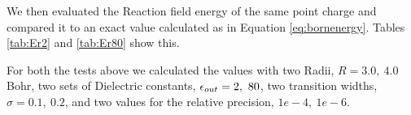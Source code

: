 \documentclass[../master_thesis.tex]{subfiles}
\begin{document}
We then evaluated the Reaction field energy of the same point charge and compared it
to an exact value calculated as in Equation  \ref{eq:bornenergy}. Tables \ref{tab:Er2}
and \ref{tab:Er80} show this.

For both the tests above we calculated the values with two Radii, $R = 3.0,\ 4.0$ Bohr,
two sets of Dielectric constants, $\epsilon_{out} = 2,\ 80$, two transition widths, $\sigma = 0.1,\ 0.2$,
and two values for the relative precision, $1e-4,\ 1e-6$.

\begin{table}[!htbp]
\caption[Reaction charge for $\epsinf = 2$]{Reaction charge for a point charge of $q = 3$ and $\epsinf = 2$ calculated with differing precision, transition width ($\sigma$) and cavity radius (Bohr) compared to the exact values}
\label{tab:Intgamma2}
\end{table}
\end{document}
